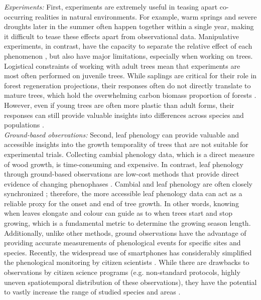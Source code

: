 \documentclass{article}
\begin{document}
\textit{Experiments:} First, experiments are extremely useful in teasing apart co-occurring realities in natural environments. For example, warm springs and severe droughts later in the summer often happen together within a single year, making it difficult to tease these effects apart from observational data. Manipulative experiments, in contrast, have the capacity to separate the relative effect of each phenomenon \citep{morin_changes_2010,primack_observations_2015}, but also have major limitations, especially when working on trees. Logistical constraints of working with adult trees mean that experiments are most often performed on juvenile trees. While saplings are critical for their role in forest regeneration projections, their responses often do not directly translate to mature trees, which hold the overwhelming carbon biomass proportion of forests \citep{augspurger_differences_2003,silvestro_longer_2023,vitasse_ontogenic_2013}. However, even if young trees are often more plastic than adult forms, their responses can still provide valuable insights into differences across species and populations \citep{wolkovich_why_2025}. \\

\textit{Ground-based observations:} 
Second, leaf phenology can provide valuable and accessible insights into the growth temporality of trees that are not suitable for experimental trials. Collecting cambial phenology data, which is a direct measure of wood growth, is time-consuming and expensive. In contrast, leaf phenology through ground-based observations are low-cost methods that provide direct evidence of changing phenophases \citep{piao_plant_2019}. Cambial and leaf phenology are often closely synchronized \citep{stridbeck_partly_2022}; therefore, the more accessible leaf phenology data can act as a reliable proxy for the onset and end of tree growth. In other words, knowing when leaves elongate and colour can guide as to when trees start and stop growing, which is a fundamental metric to determine the growing season length. Additionally, unlike other methods, ground observations have the advantage of providing accurate measurements of phenological events for specific sites and species. Recently, the widespread use of smartphones has considerably simplified the phenological monitoring by citizen scientists \citep{dickinson_current_2012,hufkens_monitoring_2019,piao_plant_2019}. While there are drawbacks to observations by citizen science programs (e.g. non-standard protocols, highly uneven spatiotemporal distribution of these observations), they have the potential to vastly increase the range of studied species and areas \citep{chandler_contribution_2017,feldman_how_2018}. \\
 
\end{document}
